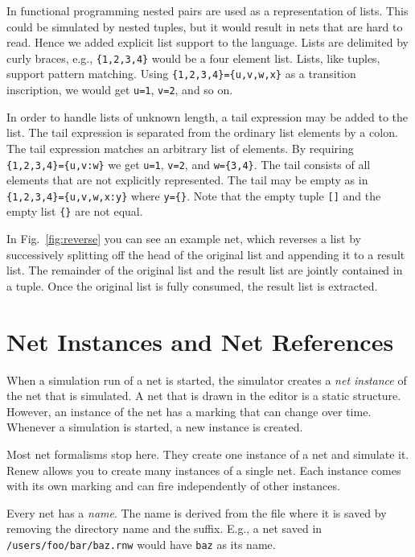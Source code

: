 In functional programming
nested pairs are used as a representation of lists.
This could be simulated by nested tuples, but it would
result in nets that are hard to read. Hence we added
explicit list support to the language.
Lists are delimited by curly braces, e.g., \verb|{1,2,3,4}|
would be a four element list. Lists, like tuples, support pattern
matching. Using \verb|{1,2,3,4}={u,v,w,x}| as a transition
inscription, we would get \texttt{u=1}, \texttt{v=2}, and so on.


In order to handle lists of unknown length, a tail expression
may be added to the list. The tail expression is separated
from the ordinary list elements by a colon. The tail expression
matches an arbitrary list of elements.
By requiring \verb|{1,2,3,4}={u,v:w}| we get
\texttt{u=1}, \texttt{v=2}, and \verb|w={3,4}|. The tail
consists of all elements that are not explicitly represented.
The tail may be empty as in \verb|{1,2,3,4}={u,v,w,x:y}|
where \verb|y={}|. Note that the empty tuple \texttt{[]}
and the empty list \verb|{}| are not equal.

In Fig.~\ref{fig:reverse} you can see an example net, which reverses
a list by successively splitting off the head of the original list
and appending it to a result list. The remainder of the
original list and the result list are jointly contained
in a tuple. Once the original list is fully consumed, the result
list is extracted.


\section{Net Instances and Net References}
\label{sec:netinst}

When a simulation run of a net is started, the simulator creates
a \emph{net instance} of the net that is simulated.
A net that is drawn in the editor
is a static structure. However, an instance of the net has a
marking that can change over time. Whenever a simulation is started,
a new instance is created.

Most net formalisms stop here. They create one instance of a net
and simulate it. Renew allows you to create many instances
of a single net. Each instance comes with its own marking
and can fire independently of other instances.

Every net has a \emph{name}. The name is derived from the file
where it is saved by removing the directory name and
the suffix. E.g., a net saved in \texttt{/users/foo/bar/baz.rnw}
would have \texttt{baz} as its name.

